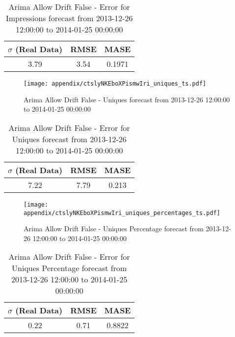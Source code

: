 \begin{table}[H]
\centering
\footnotesize
\begin{tabular}{ccc}
$\sigma$ (Real Data) & RMSE & MASE   \\ \hline
3.79 & 3.54 & 0.1971 \\
\end{tabular}

\vspace{0.5cm}

\caption[]{
Arima Allow Drift False - Error for Impressions forecast from 2013-12-26 12:00:00 to 2014-01-25 00:00:00}
\end{table}

\begin{figure}[H] \begin{center} \leavevmode
\texttt{[image: appendix/ctslyNKEboXPismwIri\_uniques\_ts.pdf]} \caption[]{
Arima Allow Drift False - Uniques forecast from 2013-12-26 12:00:00 to 2014-01-25 00:00:00} \label{fig:appendix/ctslyNKEboXPismwIri_uniques_ts.pdf} \end{center}
\end{figure}

\begin{table}[H]
\centering
\footnotesize
\begin{tabular}{ccc}
$\sigma$ (Real Data) & RMSE & MASE   \\ \hline
7.22 & 7.79 & 0.213 \\
\end{tabular}

\vspace{0.5cm}

\caption[]{
Arima Allow Drift False - Error for Uniques forecast from 2013-12-26 12:00:00 to 2014-01-25 00:00:00}
\end{table}

\begin{figure}[H] \begin{center} \leavevmode
\texttt{[image: appendix/ctslyNKEboXPismwIri\_uniques\_percentages\_ts.pdf]} \caption[]{
Arima Allow Drift False - Uniques Percentage forecast from 2013-12-26 12:00:00 to 2014-01-25 00:00:00} \label{fig:appendix/ctslyNKEboXPismwIri_uniques_percentages_ts.pdf} \end{center}
\end{figure}

\begin{table}[H]
\centering
\footnotesize
\begin{tabular}{ccc}
$\sigma$ (Real Data) & RMSE & MASE   \\ \hline
0.22 & 0.71 & 0.8822 \\
\end{tabular}

\vspace{0.5cm}

\caption[]{
Arima Allow Drift False - Error for Uniques Percentage forecast from 2013-12-26 12:00:00 to 2014-01-25 00:00:00}
\end{table}

